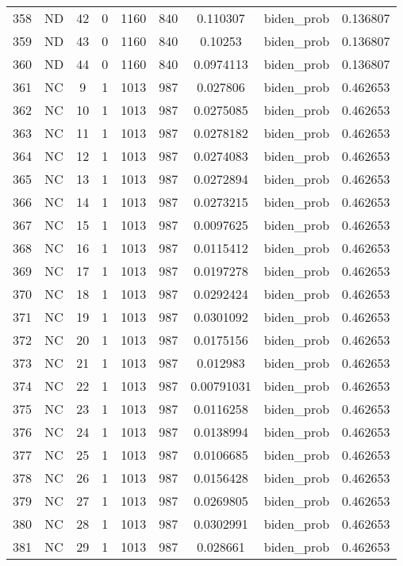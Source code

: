 \documentclass[12pt,a4paper]{article}
\begin{document}
\begin{tabular}{r|cccccccc}
	358 & ND & 42 & 0 & 1160 & 840 & 0.110307 & biden\_prob & 0.136807 \\
	359 & ND & 43 & 0 & 1160 & 840 & 0.10253 & biden\_prob & 0.136807 \\
	360 & ND & 44 & 0 & 1160 & 840 & 0.0974113 & biden\_prob & 0.136807 \\
	361 & NC & 9 & 1 & 1013 & 987 & 0.027806 & biden\_prob & 0.462653 \\
	362 & NC & 10 & 1 & 1013 & 987 & 0.0275085 & biden\_prob & 0.462653 \\
	363 & NC & 11 & 1 & 1013 & 987 & 0.0278182 & biden\_prob & 0.462653 \\
	364 & NC & 12 & 1 & 1013 & 987 & 0.0274083 & biden\_prob & 0.462653 \\
	365 & NC & 13 & 1 & 1013 & 987 & 0.0272894 & biden\_prob & 0.462653 \\
	366 & NC & 14 & 1 & 1013 & 987 & 0.0273215 & biden\_prob & 0.462653 \\
	367 & NC & 15 & 1 & 1013 & 987 & 0.0097625 & biden\_prob & 0.462653 \\
	368 & NC & 16 & 1 & 1013 & 987 & 0.0115412 & biden\_prob & 0.462653 \\
	369 & NC & 17 & 1 & 1013 & 987 & 0.0197278 & biden\_prob & 0.462653 \\
	370 & NC & 18 & 1 & 1013 & 987 & 0.0292424 & biden\_prob & 0.462653 \\
	371 & NC & 19 & 1 & 1013 & 987 & 0.0301092 & biden\_prob & 0.462653 \\
	372 & NC & 20 & 1 & 1013 & 987 & 0.0175156 & biden\_prob & 0.462653 \\
	373 & NC & 21 & 1 & 1013 & 987 & 0.012983 & biden\_prob & 0.462653 \\
	374 & NC & 22 & 1 & 1013 & 987 & 0.00791031 & biden\_prob & 0.462653 \\
	375 & NC & 23 & 1 & 1013 & 987 & 0.0116258 & biden\_prob & 0.462653 \\
	376 & NC & 24 & 1 & 1013 & 987 & 0.0138994 & biden\_prob & 0.462653 \\
	377 & NC & 25 & 1 & 1013 & 987 & 0.0106685 & biden\_prob & 0.462653 \\
	378 & NC & 26 & 1 & 1013 & 987 & 0.0156428 & biden\_prob & 0.462653 \\
	379 & NC & 27 & 1 & 1013 & 987 & 0.0269805 & biden\_prob & 0.462653 \\
	380 & NC & 28 & 1 & 1013 & 987 & 0.0302991 & biden\_prob & 0.462653 \\
	381 & NC & 29 & 1 & 1013 & 987 & 0.028661 & biden\_prob & 0.462653 \\

\end{tabular}
\end{document}

